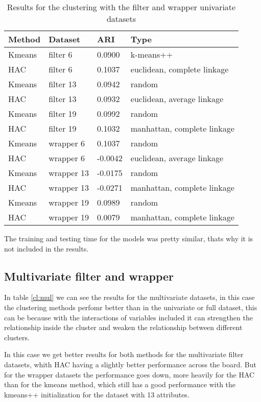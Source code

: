 \documentclass[a4paper,11pt]{article}
\begin{document}
\begin{table}
\centering
\begin{tabular}{|l|l|l|l|}
\hline

\textbf{Method} & \textbf{Dataset} & \textbf{ARI} & \textbf{Type} \\ \hline
Kmeans & filter 6 & 0.0900 & k-means++ \\ \hline
HAC & filter 6 & 0.1037 & euclidean, complete linkage \\ \hline
Kmeans & filter 13 & 0.0942 & random \\ \hline
HAC & filter 13 & 0.0932 & euclidean, average linkage \\ \hline
Kmeans & filter 19 & 0.0992 & random \\ \hline
HAC & filter 19 & 0.1032 & manhattan, complete linkage \\ \hline
Kmeans & wrapper 6 & 0.1037 & random \\ \hline
HAC & wrapper 6 & -0.0042 & euclidean, average linkage \\ \hline
Kmeans & wrapper 13 & -0.0175 & random \\ \hline
HAC & wrapper 13 & -0.0271 & manhattan, complete linkage \\ \hline
Kmeans & wrapper 19 & 0.0989 & random \\ \hline
HAC & wrapper 19 & 0.0079 & manhattan, complete linkage \\ \hline

\end{tabular}
\caption{Results for the clustering with the filter and wrapper univariate datasets}
\label{cl:uni}
\end{table}

The training and testing time for the models was pretty similar, thats why it is not included in the results.

\subsection{Multivariate filter and wrapper}

In table \ref{cl:mul} we can see the results for the multivariate datasets, in this case the clustering methods perfomr better than in the univariate or full dataset, this can be because with the interactions of variables included it can strengthen the relationship inside the cluster and weaken the relationship between different clusters.

In this case we get better results for both methods for the multivariate filter datasets, whith HAC having a slightly better performance across the board. But for the wrapper datasets the performance goes down, more heavily for the HAC than for the kmeans method, which still has a good performance with the kmeans++ initialization for the dataset with 13 attributes.
\end{document}
